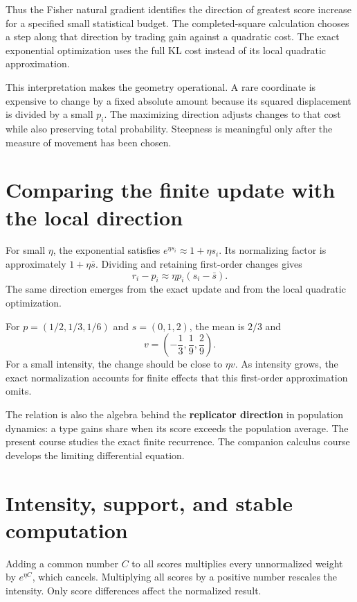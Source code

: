 \documentclass[11pt,oneside,openany]{book}
\theoremstyle{definition}
\theoremstyle{remark}
\numberwithin{equation}{chapter}
\begin{document}
Thus the Fisher natural gradient identifies the direction of greatest score increase for a specified small statistical budget. The completed-square calculation chooses a step along that direction by trading gain against a quadratic cost. The exact exponential optimization uses the full KL cost instead of its local quadratic approximation.

This interpretation makes the geometry operational. A rare coordinate is expensive to change by a fixed absolute amount because its squared displacement is divided by a small \(p_i\). The maximizing direction adjusts changes to that cost while also preserving total probability. Steepness is meaningful only after the measure of movement has been chosen.

\section{Comparing the finite update with the local direction}\label{ch09-comparing-the-finite-update-with-the-local-direction}

For small \(\eta\), the exponential satisfies \(e^{\eta s_i}\approx1+\eta s_i\). Its normalizing factor is approximately \(1+\eta\bar s\). Dividing and retaining first-order changes gives \[r_i-p_i\approx\eta p_i(s_i-\bar s).\] The same direction emerges from the exact update and from the local quadratic optimization.

For \(p=(1/2,1/3,1/6)\) and \(s=(0,1,2)\), the mean is \(2/3\) and \[v=\left(-\frac13,\frac19,\frac29\right).\] For a small intensity, the change should be close to \(\eta v\). As intensity grows, the exact normalization accounts for finite effects that this first-order approximation omits.

The relation is also the algebra behind the \textbf{replicator direction} in population dynamics: a type gains share when its score exceeds the population average. The present course studies the exact finite recurrence. The companion calculus course develops the limiting differential equation.

\section{Intensity, support, and stable computation}\label{ch09-intensity-support-and-stable-computation}

Adding a common number \(C\) to all scores multiplies every unnormalized weight by \(e^{\eta C}\), which cancels. Multiplying all scores by a positive number rescales the intensity. Only score differences affect the normalized result.
\end{document}
